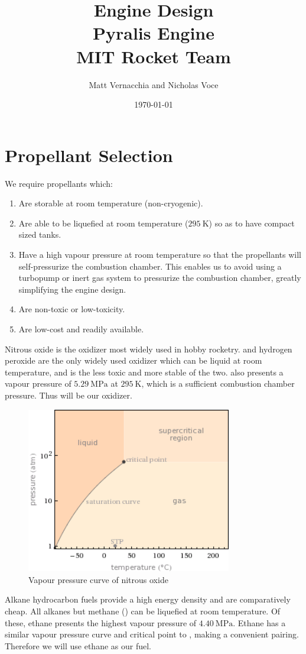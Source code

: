 \documentclass{article}
\title{Engine Design \\ Pyralis Engine \\ MIT Rocket Team} %
\author{Matt Vernacchia and Nicholas Voce} %
\date{ \today } %
\begin{document}
\section{Propellant Selection}
We require propellants which:
\begin{enumerate}
\item Are storable at room temperature (non-cryogenic).
\item Are able to be liquefied at room temperature ($\SI{295}{\kelvin}$) so as to have compact sized tanks.
\item Have a high vapour pressure at room temperature so that the propellants will self-pressurize the combustion chamber. This enables us to avoid using a turbopump or inert gas system to pressurize the combustion chamber, greatly simplifying the engine design.
\item Are non-toxic or low-toxicity.
\item Are low-cost and readily available.
\end{enumerate}
Nitrous oxide  is the oxidizer most widely used in hobby rocketry.  and hydrogen peroxide are the only widely used oxidizer which can be liquid at room temperature, and  is the less toxic and more stable of the two.  also presents a vapour pressure of $\SI{5.29}{\mega\pascal}$ at $\SI{295}{\kelvin}$, which is a sufficient combustion chamber pressure. Thus  will be our oxidizer.\\
\begin{figure}[h!]
\centering
\includegraphics[width = 0.8\textwidth]{n2o_vap.png}
\caption{Vapour pressure curve of nitrous oxide} 
\label{n2o_vap}
\end{figure}
Alkane hydrocarbon fuels provide a high energy density and are comparatively cheap. All alkanes but methane () can be liquefied at room temperature. Of these, ethane  presents the highest vapour pressure of $\SI{4.40}{\mega\pascal}$. Ethane has a similar vapour pressure curve and critical point to , making a convenient pairing. Therefore we will use ethane as our fuel.
\end{document}

